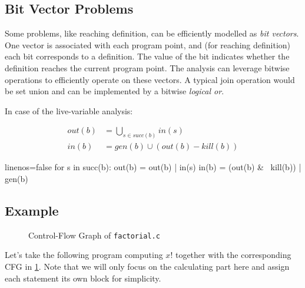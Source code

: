\documentclass[article]{uibk}
\begin{document}
\subsection{Bit Vector Problems}

Some problems, like reaching definition, can be efficiently modelled as
\textit{bit vectors}. One vector is associated with each program point, and
(for reaching definition) each bit corresponds to a definition. The value of
the bit indicates whether the definition reaches the current program point. The
analysis can leverage bitwise operations to efficiently operate on these
vectors. A typical join operation would be set union and can be implemented by
a bitwise \textit{logical or}.~\cite{wiki:dfa}

In case of the live-variable analysis:

\vspace{-1.5em}
\begin{minipage}[t]{0.45\textwidth}
    \begin{align*}
        out(b) &= \bigcup_{s \in succ(b)} in(s) \\
        in(b)  &= gen(b) \cup (out(b) - kill(b))
    \end{align*}
\end{minipage}\hfill
\begin{minipage}[t]{0.45\textwidth}
    \vspace{1.5em}
    \begin{code*}{linenos=false}
        for s in succ(b):
            out(b) = out(b) | in(s)
        in(b) = (out(b) & ~kill(b)) | gen(b)
    \end{code*}
\end{minipage}

\subsection{Example}

\begin{figure}
    \vspace{-1.4em}
    \centering
    
    \caption{Control-Flow Graph of \mbox{\texttt{factorial.c}}}
    \label{fig:factorial}
\end{figure}

Let's take the following program computing $x!$ together with the corresponding
CFG in \cref{fig:factorial}. Note that we will only focus on the calculating
part here and assign each statement its own block for
simplicity.~\cite{Nielson:ppa}
\end{document}
